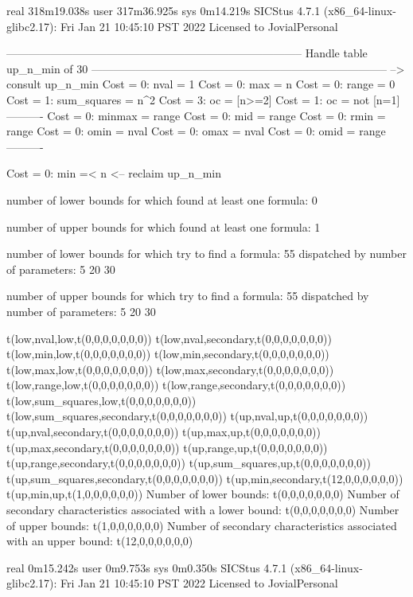 real	318m19.038s
user	317m36.925s
sys	0m14.219s
SICStus 4.7.1 (x86_64-linux-glibc2.17): Fri Jan 21 10:45:10 PST 2022
Licensed to JovialPersonal


--------------------------------------------------------------------------------
Handle table up_n_min of 30
--------------------------------------------------------------------------------
--> consult up_n_min
Cost =  0:  nval        = 1
Cost =  0:  max         = n
Cost =  0:  range       = 0
Cost =  1:  sum_squares = n^2
Cost =  3:  oc          = [n>=2]
Cost =  1:  oc          = not [n=1]
----------
Cost =  0:  minmax      = range
Cost =  0:  mid         = range
Cost =  0:  rmin        = range
Cost =  0:  omin        = nval
Cost =  0:  omax        = nval
Cost =  0:  omid        = range
----------

Cost =  0:  min =< n
<-- reclaim up_n_min

number of lower bounds for which found at least one formula: 0

number of upper bounds for which found at least one formula: 1

number of lower bounds for which try to find a formula: 55
dispatched by number of parameters: 5  20  30

number of upper bounds for which try to find a formula: 55
dispatched by number of parameters: 5  20  30

t(low,nval,low,t(0,0,0,0,0,0,0))
t(low,nval,secondary,t(0,0,0,0,0,0,0))
t(low,min,low,t(0,0,0,0,0,0,0))
t(low,min,secondary,t(0,0,0,0,0,0,0))
t(low,max,low,t(0,0,0,0,0,0,0))
t(low,max,secondary,t(0,0,0,0,0,0,0))
t(low,range,low,t(0,0,0,0,0,0,0))
t(low,range,secondary,t(0,0,0,0,0,0,0))
t(low,sum_squares,low,t(0,0,0,0,0,0,0))
t(low,sum_squares,secondary,t(0,0,0,0,0,0,0))
t(up,nval,up,t(0,0,0,0,0,0,0))
t(up,nval,secondary,t(0,0,0,0,0,0,0))
t(up,max,up,t(0,0,0,0,0,0,0))
t(up,max,secondary,t(0,0,0,0,0,0,0))
t(up,range,up,t(0,0,0,0,0,0,0))
t(up,range,secondary,t(0,0,0,0,0,0,0))
t(up,sum_squares,up,t(0,0,0,0,0,0,0))
t(up,sum_squares,secondary,t(0,0,0,0,0,0,0))
t(up,min,secondary,t(12,0,0,0,0,0,0))
t(up,min,up,t(1,0,0,0,0,0,0))
Number of lower bounds:                                             t(0,0,0,0,0,0,0)
Number of secondary characteristics associated with a lower bound:  t(0,0,0,0,0,0,0)
Number of upper bounds:                                             t(1,0,0,0,0,0,0)
Number of secondary characteristics associated with an upper bound: t(12,0,0,0,0,0,0)

real	0m15.242s
user	0m9.753s
sys	0m0.350s
SICStus 4.7.1 (x86_64-linux-glibc2.17): Fri Jan 21 10:45:10 PST 2022
Licensed to JovialPersonal


